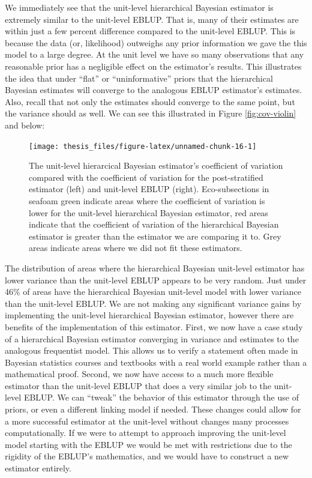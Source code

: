 \documentclass[12pt,twoside]{reedthesis}
\begin{document}
We immediately see that the unit-level hierarchical Bayesian estimator is extremely similar to the unit-level EBLUP. That is, many of their estimates are within just a few percent difference compared to the unit-level EBLUP. This is because the data (or, likelihood) outweighs any prior information we gave the this model to a large degree. At the unit level we have so many observations that any reasonable prior has a negligible effect on the estimator's results. This illustrates the idea that under ``flat'' or ``uninformative'' priors that the hierarchical Bayesian estimates will converge to the analogous EBLUP estimator's estimates. Also, recall that not only the estimates should converge to the same point, but the variance should as well. We can see this illustrated in Figure \ref{fig:cov-violin} and below:
\begin{figure}

{\centering \texttt{[image: thesis\_files/figure-latex/unnamed-chunk-16-1]} 

}

\caption[Unit-level coefficient of variation comparison across the Interior West]{The unit-level hierarcical Bayesian estimator's coefficient of variation compared with the coefficient of variation for the post-stratified estimator (left) and unit-level EBLUP (right). Eco-subsections in seafoam green indicate areas where the coefficient of variation is lower for the unit-level hierarchical Bayesian estimator, red areas indicate that the coefficient of variation of the hierarchical Bayesian estimator is greater than the estimator we are comparing it to. Grey areas indicate areas where we did not fit these estimators.}\label{fig:unnamed-chunk-16}
\end{figure}
The distribution of areas where the hierarchical Bayesian unit-level estimator has lower variance than the unit-level EBLUP appears to be very random. Just under 46\% of areas have the hierarchical Bayesian unit-level model with lower variance than the unit-level EBLUP. We are not making any significant variance gains by implementing the unit-level hierarchical Bayesian estimator, however there are benefits of the implementation of this estimator. First, we now have a case study of a hierarchical Bayesian estimator converging in variance and estimates to the analogous frequentist model. This allows us to verify a statement often made in Bayesian statistics courses and textbooks with a real world example rather than a mathematical proof. Second, we now have access to a much more flexible estimator than the unit-level EBLUP that does a very similar job to the unit-level EBLUP. We can ``tweak'' the behavior of this estimator through the use of priors, or even a different linking model if needed. These changes could allow for a more successful estimator at the unit-level without changes many processes computationally. If we were to attempt to approach improving the unit-level model starting with the EBLUP we would be met with restrictions due to the rigidity of the EBLUP's mathematics, and we would have to construct a new estimator entirely.
\end{document}
